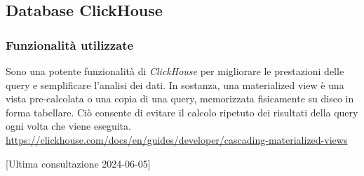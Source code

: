 

\subsection{Database ClickHouse}

\subsubsection{Funzionalità utilizzate}
Sono una potente funzionalità di \textit{ClickHouse} per migliorare le prestazioni delle query e semplificare l'analisi dei dati. In sostanza, una materialized view è una vista pre-calcolata o una copia di una query, memorizzata fisicamente su disco in forma tabellare. Ciò consente di evitare il calcolo ripetuto dei risultati della query ogni volta che viene eseguita.
\url{https://clickhouse.com/docs/en/guides/developer/cascading-materialized-views}

[Ultima consultazione 2024-06-05]

